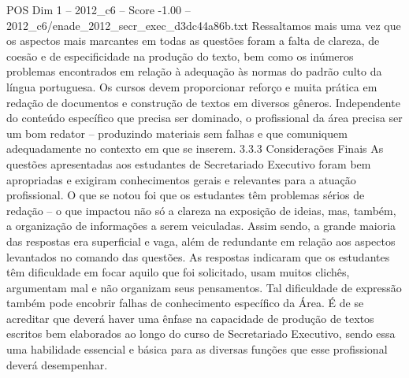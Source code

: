 \begin{textsample}{POS Dim 1 – 2012\_c6 – Score -1.00 – 2012\_c6/enade\_2012\_secr\_exec\_d3dc44a86b.txt}
Ressaltamos mais uma vez que os aspectos mais marcantes em todas as questões foram a falta de clareza, de coesão e de especificidade na produção do texto, bem como os inúmeros problemas encontrados em relação à adequação às normas do padrão culto da língua portuguesa.
Os cursos devem proporcionar reforço e muita prática em redação de documentos e construção de textos em diversos gêneros.
Independente do conteúdo específico que precisa ser dominado, o profissional da área precisa ser um bom redator – produzindo materiais sem falhas e que comuniquem adequadamente no contexto em que se inserem. 3.3.3 Considerações Finais As questões apresentadas aos estudantes de Secretariado Executivo foram bem apropriadas e exigiram conhecimentos gerais e relevantes para a atuação profissional.
O que se notou foi que os estudantes têm problemas sérios de redação – o que impactou não só a clareza na exposição de ideias, mas, também, a organização de informações a serem veiculadas.
Assim sendo, a grande maioria das respostas era superficial e vaga, além de redundante em relação aos aspectos levantados no comando das questões.
As respostas indicaram que os estudantes têm dificuldade em focar aquilo que foi solicitado, usam muitos clichês, argumentam mal e não organizam seus pensamentos.
Tal dificuldade de expressão também pode encobrir falhas de conhecimento específico da Área.
É de se acreditar que deverá haver uma ênfase na capacidade de produção de textos escritos bem elaborados ao longo do curso de Secretariado Executivo, sendo essa uma habilidade essencial e básica para as diversas funções que esse profissional deverá desempenhar.

\end{textsample}
